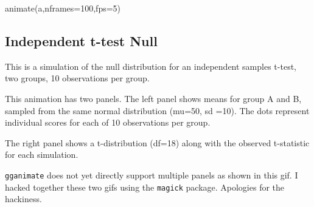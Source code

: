 \documentclass[
  letterpaper,
  DIV=11,
  numbers=noendperiod]{scrreprt}
\newenvironment{Shaded}{\begin{snugshade}}{\end{snugshade}}
\newcommand{\AttributeTok}[1]{\textcolor[rgb]{0.40,0.45,0.13}{#1}}
\newcommand{\DecValTok}[1]{\textcolor[rgb]{0.68,0.00,0.00}{#1}}
\newcommand{\FunctionTok}[1]{\textcolor[rgb]{0.28,0.35,0.67}{#1}}
\newcommand{\NormalTok}[1]{\textcolor[rgb]{0.00,0.23,0.31}{#1}}
\begin{document}
\begin{Shaded}
\begin{Highlighting}[]
\FunctionTok{animate}\NormalTok{(a,}\AttributeTok{nframes=}\DecValTok{100}\NormalTok{,}\AttributeTok{fps=}\DecValTok{5}\NormalTok{)}
\end{Highlighting}
\end{Shaded}

\subsection{Independent t-test Null}\label{independent-t-test-null}

This is a simulation of the null distribution for an independent samples
t-test, two groups, 10 observations per group.

This animation has two panels. The left panel shows means for group A
and B, sampled from the same normal distribution (mu=50, sd =10). The
dots represent individual scores for each of 10 observations per group.

The right panel shows a t-distribution (df=18) along with the observed
t-statistic for each simulation.

\texttt{gganimate} does not yet directly support multiple panels as
shown in this gif. I hacked together these two gifs using the
\texttt{magick} package. Apologies for the hackiness.
\end{document}
